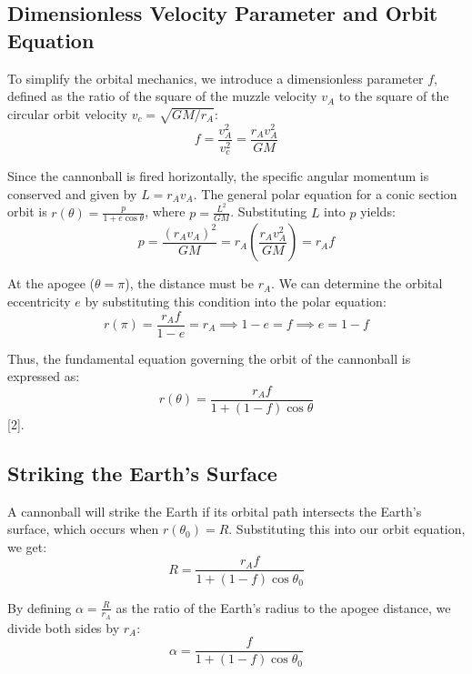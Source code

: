 \documentclass[11pt,letterpaper]{article}
\begin{document}
\subsection{Dimensionless Velocity Parameter and Orbit Equation}
To simplify the orbital mechanics, we introduce a dimensionless parameter $f$, defined as the ratio of the square of the muzzle velocity $v_A$ to the square of the circular orbit velocity $v_c = \sqrt{GM/r_A}$:
\begin{equation}
    f = \frac{v_A^2}{v_c^2} = \frac{r_A v_A^2}{GM}
\end{equation}

Since the cannonball is fired horizontally, the specific angular momentum is conserved and given by $L = r_A v_A$. The general polar equation for a conic section orbit is $r(\theta) = \frac{p}{1 + e \cos\theta}$, where $p = \frac{L^2}{GM}$. Substituting $L$ into $p$ yields:
\begin{equation}
    p = \frac{(r_A v_A)^2}{GM} = r_A \left( \frac{r_A v_A^2}{GM} \right) = r_A f
\end{equation}

At the apogee ($\theta = \pi$), the distance must be $r_A$. We can determine the orbital eccentricity $e$ by substituting this condition into the polar equation:
\begin{equation}
    r(\pi) = \frac{r_A f}{1 - e} = r_A \implies 1 - e = f \implies e = 1 - f
\end{equation}

Thus, the fundamental equation governing the orbit of the cannonball is expressed as:
\begin{equation}
    r(\theta) = \frac{r_A f}{1 + (1 - f)\cos\theta}
\end{equation} [2].

\subsection{Striking the Earth's Surface}
A cannonball will strike the Earth if its orbital path intersects the Earth's surface, which occurs when $r(\theta_0) = R$. Substituting this into our orbit equation, we get:
\begin{equation}
    R = \frac{r_A f}{1 + (1 - f)\cos\theta_0}
\end{equation}

By defining $\alpha = \frac{R}{r_A}$ as the ratio of the Earth's radius to the apogee distance, we divide both sides by $r_A$:
\begin{equation}
    \alpha = \frac{f}{1 + (1 - f)\cos\theta_0}
\end{equation}
\end{document}
